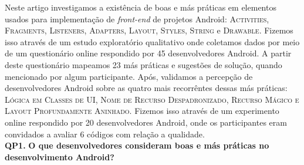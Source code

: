 


Neste artigo investigamos a existência de boas e más práticas em elementos usados para implementação de \textit{front-end} de projetos Android: \textsc{Activities}, \textsc{Fragments}, \textsc{Listeners}, \textsc{Adapters}, \textsc{Layout}, \textsc{Styles}, \textsc{String} e \textsc{Drawable}. Fizemos isso através de um estudo exploratório qualitativo onde coletamos dados por meio de um questionário online respondido por 45 desenvolvedores Android. A partir deste questionário mapeamos 23 más práticas e sugestões de solução, quando mencionado por algum participante. Após, validamos a percepção de desenvolvedores Android sobre as quatro mais recorrêntes dessas más práticas: \textsc{Lógica em Classes de UI}, \textsc{Nome de Recurso Despadronizado}, \textsc{Recurso Mágico e Layout Profundamente Aninhado}. Fizemos isso através de um experimento online respondido por 20 desenvolvedores Android, onde os participantes eram convidados a avaliar 6 códigos com relação a qualidade. \\

\textbf{QP1.} \textbf{O que desenvolvedores consideram boas e más práticas no desenvolvimento Android?} 

